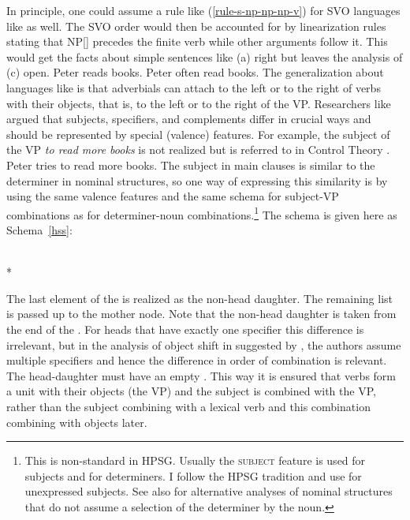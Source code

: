 \documentclass[output=paper
	        ,collection
	        ,collectionchapter
 	        ,biblatex
                ,babelshorthands
                ,newtxmath
                ,draftmode
                ,colorlinks, citecolor=brown
]{langscibook}
\begin{document}
In principle, one could assume a rule like (\ref{rule-s-np-np-np-v}) for SVO languages like 
as well. The SVO order would then be accounted for by linearization rules stating that
NP[] precedes the finite verb while other arguments follow it. This would get the facts
about simple sentences like (a) right but leaves the analysis of (c) open.
\eal
\ex Peter reads books.
\ex Peter often read books.
\zl
The generalization about languages like  is that adverbials can attach to the left or to the
right of verbs with their objects, that is, to the left or to the right of the VP. Researchers like
\citet{Borsley87a} argued that subjects, specifiers, and complements differ in crucial ways and
should be represented by special (valence) features. For example, the subject of the VP \emph{to read
 more books} is not realized but is referred to in Control Theory .
\ea
Peter tries to read more books.
\z 
The subject in  main clauses is similar to the determiner in nominal structures, so one
way of expressing this similarity is by using the same valence features and the same schema for
subject-VP combinations as for determiner-noun combinations.\footnote{
  This is non-standard in HPSG. Usually the \textsc{subject} feature is used for subjects and \spr
  for determiners. I follow the  HPSG tradition and use \subj for unexpressed subjects. See
  also  for alternative analyses of nominal structures that do not assume a
  selection of the determiner by the noun.%
}
The schema is given here as Schema~\ref{hss}:

\begin{schema}\label{hss}
 \impl\\*
\end{schema}
The last element of the \sprl is realized as the non-head daughter. The remaining list is passed up
to the mother node. 
Note that the non-head daughter is taken from the end of the \sprl. For heads that have exactly one specifier this
difference is irrelevant, but in the analysis of object shift in  suggested by \citet{MOe2013b},
the authors assume multiple specifiers and hence the difference in order of combination is
relevant. The head-daughter must have an empty \compsl. This way it is ensured that verbs form a
unit with their objects (the VP) and the subject is combined with the VP, rather than the subject
combining with a lexical verb and this combination combining with objects later.
\end{document}
